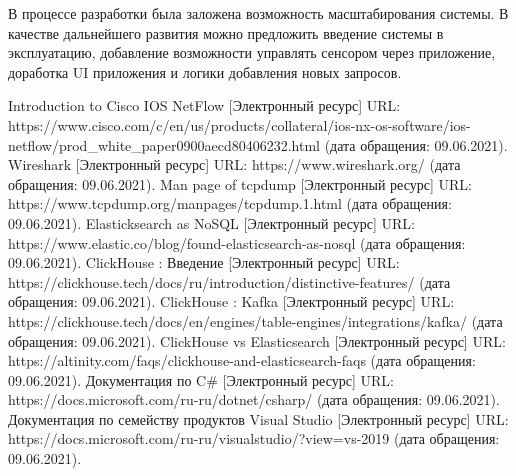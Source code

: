 В процессе разработки была заложена возможность масштабирования системы. В качестве дальнейшего развития можно предложить введение системы в эксплуатацию, добавление возможности управлять сенсором через приложение, доработка UI приложения и логики добавления новых запросов.

\clearpage
\begin{thebibliography}{9}
	 Introduction to Cisco IOS NetFlow [Электронный ресурс] URL: https://www.cisco.com/c/en/us/products/collateral/ios-nx-os-software/ios-netflow/prod\_white\_paper0900aecd80406232.html (дата обращения: 09.06.2021).
	 Wireshark [Электронный ресурс] URL: https://www.wireshark.org/ (дата обращения: 09.06.2021).
	 Man page of tcpdump [Электронный ресурс] URL: https://www.tcpdump.org/manpages/tcpdump.1.html (дата обращения: 09.06.2021).
	 Elasticksearch as NoSQL [Электронный ресурс] URL:  https://www.elastic.co/blog/found-elasticsearch-as-nosql (дата обращения: 09.06.2021).
	 ClickHouse : Введение [Электронный ресурс] URL: https://clickhouse.tech/docs/ru/introduction/distinctive-features/ (дата обращения: 09.06.2021).
	 ClickHouse : Kafka [Электронный ресурс] URL: https://clickhouse.tech/docs/en/engines/table-engines/integrations/kafka/ (дата обращения: 09.06.2021).
	 ClickHouse vs Elasticsearch [Электронный ресурс] URL: https://altinity.com/faqs/clickhouse-and-elasticsearch-faqs (дата обращения: 09.06.2021).
	 Документация по C\# [Электронный ресурс] URL: https://docs.microsoft.com/ru-ru/dotnet/csharp/ (дата обращения: 09.06.2021).
	 Документация по семейству продуктов Visual Studio [Электронный ресурс] URL: https://docs.microsoft.com/ru-ru/visualstudio/?view=vs-2019 (дата обращения: 09.06.2021).
\end{thebibliography}

